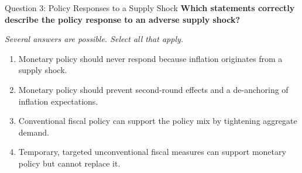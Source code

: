 \documentclass[11pt,aspectratio=169]{beamer}
\begin{document}
\begin{frame}{Question 3: Policy Responses to a Supply Shock}
\textbf{Which statements correctly describe the policy response to an adverse supply shock?}
\par\vspace{.6em}
{\small\textit{Several answers are possible. Select all that apply.}\par}
\vspace{.6em}
\begin{enumerate}
\item[A.] Monetary policy should never respond because inflation originates from a supply shock.
\item[B.] Monetary policy should prevent second-round effects and a de-anchoring of inflation expectations.
\item[C.] Conventional fiscal policy can support the policy mix by tightening aggregate demand.
\item[D.] Temporary, targeted unconventional fiscal measures can support monetary policy but cannot replace it.
\end{enumerate}
\end{frame}
\end{document}
